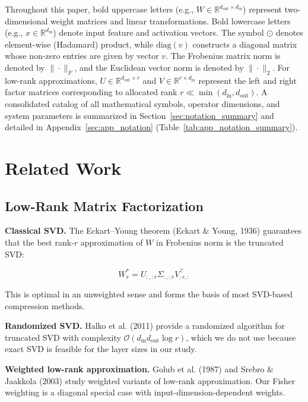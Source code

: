 Throughout this paper, bold uppercase letters (e.g., $W \in \mathbb{R}^{d_{\mathrm{out}} \times d_{\mathrm{in}}}$) represent two-dimensional weight matrices and linear transformations. Bold lowercase letters (e.g., $x \in \mathbb{R}^{d_{\mathrm{in}}}$) denote input feature and activation vectors. The symbol $\odot$ denotes element-wise (Hadamard) product, while $\mathrm{diag}(v)$ constructs a diagonal matrix whose non-zero entries are given by vector $v$. The Frobenius matrix norm is denoted by $\|\cdot\|_F$, and the Euclidean vector norm is denoted by $\|\cdot\|_2$. For low-rank approximations, $U \in \mathbb{R}^{d_{\mathrm{out}} \times r}$ and $V \in \mathbb{R}^{r \times d_{\mathrm{in}}}$ represent the left and right factor matrices corresponding to allocated rank $r \ll \min(d_{\mathrm{in}}, d_{\mathrm{out}})$. A consolidated catalog of all mathematical symbols, operator dimensions, and system parameters is summarized in Section~\ref{sec:notation_summary} and detailed in Appendix~\ref{sec:app_notation} (Table~\ref{tab:app_notation_summary}).



\section{Related Work}

\subsection{Low-Rank Matrix Factorization}

\textbf{Classical SVD.} The Eckart--Young theorem (Eckart \& Young, 1936) guarantees 
that the best rank-$r$ approximation of $W$ in Frobenius norm is the truncated 
SVD:

\[
W_r^* = U_{:, :r} \Sigma_{:, :r} V_{:r, :}^\top
\tag{2.1}
\]

This is optimal in an unweighted sense and forms the basis of most 
SVD-based compression methods.

\textbf{Randomized SVD.} Halko et al. (2011) provide a randomized algorithm for 
truncated SVD with complexity $\mathcal{O}(d_\text{in} d_\text{out} \log r)$, 
which we do not use because exact SVD is feasible for the layer sizes in our 
study.

\textbf{Weighted low-rank approximation.} Golub et al. (1987) and Srebro \& Jaakkola 
(2003) study weighted variants of low-rank approximation. Our Fisher weighting 
is a diagonal special case with input-dimension-dependent weights.

